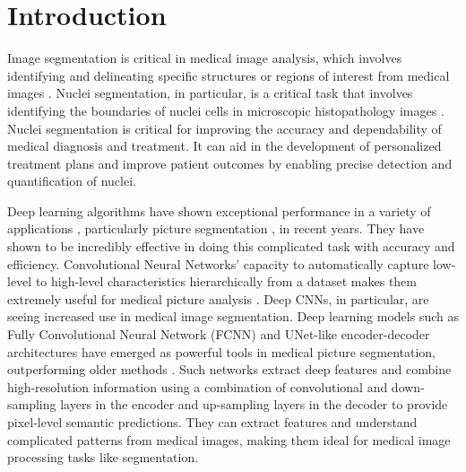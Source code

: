 \documentclass{article}
\begin{document}
\section{Introduction}\label{Introduction}
Image segmentation is critical in medical image analysis, which involves identifying and delineating specific structures or regions of interest from medical images \cite{kumar2019multi}. Nuclei segmentation, in particular, is a critical task that involves identifying the boundaries of nuclei cells in microscopic histopathology images \cite{kumar2019multi}. Nuclei segmentation is critical for improving the accuracy and dependability of medical diagnosis and treatment. It can aid in the development of personalized treatment plans and improve patient outcomes by enabling precise detection and quantification of nuclei.

Deep learning algorithms have shown exceptional performance in a variety of applications \cite{tayyab2022survey, sohail2023deep, khan2023survey_covid, Rauf2023-tc}, particularly picture segmentation \cite{long2015fully, ronneberger2015u, cao2022swin, rauf2023attention, ali2022channel, aziz2020channel, sohail2021mitotic, khan2023segmentation, khan2023survey, zhang2022multi, vu2019dense, liu2023mestrans}, in recent years. They have shown to be incredibly effective in doing this complicated task with accuracy and efficiency. Convolutional Neural Networks' capacity to automatically capture low-level to high-level characteristics hierarchically from a dataset makes them extremely useful for medical picture analysis \cite{khan2020survey}. Deep CNNs, in particular, are seeing increased use in medical image segmentation. Deep learning models such as Fully Convolutional Neural Network (FCNN) \cite{long2015fully} and UNet-like encoder-decoder architectures have emerged as powerful tools in medical picture segmentation, outperforming older methods \cite{ronneberger2015u, ibtehaz2020multiresunet, zhou2019unet++, oktay2018attention, cciccek20163d, cao2022swin}. Such networks extract deep features and combine high-resolution information using a combination of convolutional and down-sampling layers in the encoder and up-sampling layers in the decoder to provide pixel-level semantic predictions. They can extract features and understand complicated patterns from medical images, making them ideal for medical image processing tasks like segmentation.
\end{document}
